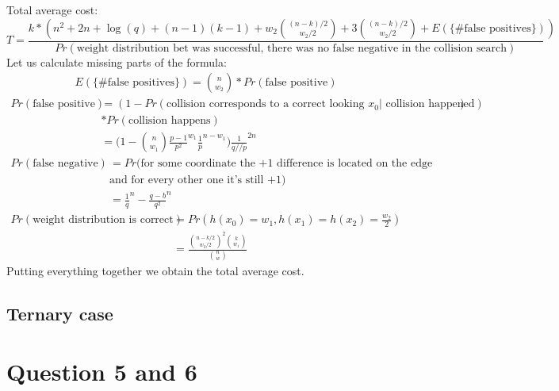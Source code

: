 \documentclass[12pt]{article}
\begin{document}
Total average cost:
\[
    T = \frac{k*(n^2 + 2n + \log(q) + (n-1)(k-1) + w_2\binom{(n-k)/2}{w_2/2} + 3\binom{(n-k)/2}{w_2/2} + E(\{\text{\# false positives}\}))}{Pr(\text{weight distribution bet was successful, there was no false negative in the collision search})}
\]
Let us calculate missing parts of the formula:
\[
\begin{split}
    E(\{\text{\# false positives}\}) = \binom{n}{w_2}*Pr(\text{false positive})
\end{split}
\]
\[
\begin{split}
    Pr(\text{false positive}) & = (1 - Pr(\text{collision corresponds to a correct looking } x_0| \text{  collision happened})) \\
    & * Pr(\text{collision happens}) \\
    & = \Big(1 - \binom{n}{w_1}\frac{p-1}{p^2}^{w_1}\frac{1}{p}^{n-w_1}\Big)\frac{1}{q//p}^{2n}
\end{split}
\]
\[
\begin{split}
    Pr(\text{false negative}) & = Pr(\text{for some coordinate the +1 difference is located on the edge of the box} \\
    & \text{and for every other one it's still +1}) \\
    & = \frac{1}{q}^{n} - \frac{q-b}{q^2}^{n}
\end{split}
\]
\[
\begin{split}
    Pr(\text{weight distribution is correct}) & = Pr(h(x_0) = w_1, h(x_1) = h(x_2) = \frac{w_2}{2}) \\
    & = \frac{\binom{n-k/2}{w_2/2}^{2}\binom{k}{w_1}}{\binom{n}{w}}
\end{split}
\]
Putting everything together we obtain the total average cost.

\subsection{Ternary case}

\section{Question 5 and 6}




\end{document}
